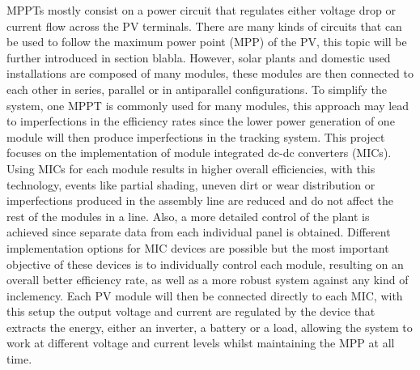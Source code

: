 MPPTs mostly consist on a power circuit that regulates either voltage drop or current flow across the PV terminals. There are many kinds of circuits that can be used to follow the maximum power point (MPP) of the PV, this topic will be further introduced in section blabla. 
However, solar plants and domestic used installations are composed of many modules, these modules are then connected to each other in series, parallel or in antiparallel configurations. To simplify the system, one MPPT is commonly used for many modules, this approach may lead to imperfections in the efficiency rates since the lower power generation of one module will then produce imperfections in the tracking system. 
This project focuses on the implementation of module integrated dc-dc converters (MICs). Using MICs for each module results in higher overall efficiencies, with this technology, events like partial shading, uneven dirt or wear distribution or imperfections produced in the assembly line are reduced and do not affect the rest of the modules in a line. Also, a more detailed control of the plant is achieved since separate data from each individual panel is obtained.
Different implementation options for MIC devices are possible but the most important objective of these devices is to individually control each module, resulting on an overall better efficiency rate, as well as a more robust system against any kind of inclemency. Each PV module will then be connected directly to each MIC, with this setup the output voltage and current are regulated by the device that extracts the energy, either an inverter, a battery or a load, allowing the system to work at different voltage and current levels whilst maintaining the MPP at all time.




